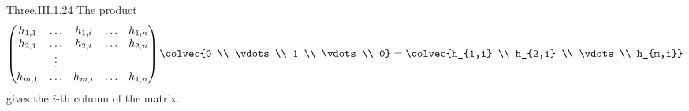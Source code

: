 \begin{ans}{Three.III.1.24}
      The product
      \begin{equation*}
        \begin{pmatrix}
          h_{1,1} &\ldots  &h_{1,i} &\ldots &h_{1,n}  \\
          h_{2,1} &\ldots  &h_{2,i} &\ldots &h_{2,n}  \\
                  &\vdots                             \\
          h_{m,1} &\ldots  &h_{m,i} &\ldots &h_{1,n}
        \end{pmatrix}
        \colvec{0 \\ \vdots \\ 1 \\ \vdots \\ 0}
        =
        \colvec{h_{1,i} \\ h_{2,i} \\ \vdots \\ h_{m,i}}
      \end{equation*}
      gives the \( i \)-th column of the matrix.
    
\end{ans}
